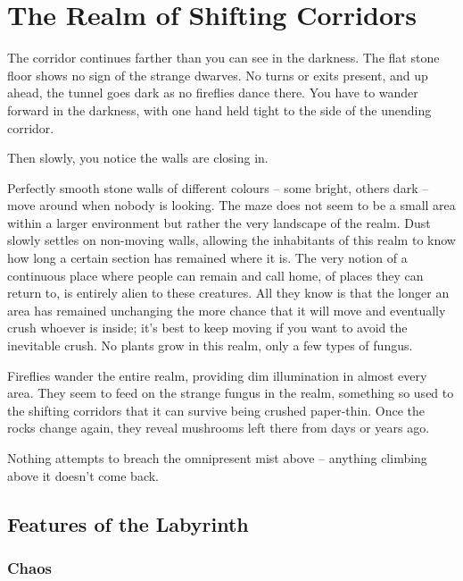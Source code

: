 \section{The Realm of Shifting Corridors}\label{shiftingcorridors}

\begin{multicols}{2}

\begin{boxtext}
	The corridor continues farther than you can see in the darkness.
	The flat stone floor shows no sign of the strange dwarves.
	No turns or exits present, and up ahead, the tunnel goes dark as no fireflies dance there.
	You have to wander forward in the darkness, with one hand held tight to the side of the unending corridor.

	Then slowly, you notice the walls are closing in.

\end{boxtext}

Perfectly smooth stone walls of different colours -- some bright, others dark -- move around when nobody is looking.
The maze does not seem to be a small area within a larger environment but rather the very landscape of the realm.
Dust slowly settles on non-moving walls, allowing the inhabitants of this realm to know how long a certain section has remained where it is.
The very notion of a continuous place where people can remain and call home, of places they can return to, is entirely alien to these creatures.
All they know is that the longer an area has remained unchanging the more chance that it will move and eventually crush whoever is inside; it's best to keep moving if you want to avoid the inevitable crush.
No plants grow in this realm, only a few types of fungus.

Fireflies wander the entire realm, providing dim illumination in almost every area.  They seem to feed on the strange fungus in the realm, something so used to the shifting corridors that it can survive being crushed paper-thin.  Once the rocks change again, they reveal mushrooms left there from days or years ago.

Nothing attempts to breach the omnipresent mist above -- anything climbing above it doesn't come back.

\subsection{Features of the Labyrinth}

\subsubsection{Chaos}


\end{multicols}
